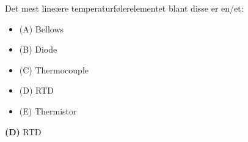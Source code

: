 

Det mest lineære temperaturfølerelementet blant disse er en/et:

\begin{itemize}
\item{(A)} Bellows
\vskip 5pt 
\item{(B)} Diode
\vskip 5pt 
\item{(C)} Thermocouple
\vskip 5pt 
\item{(D)} RTD
\vskip 5pt 
\item{(E)} Thermistor
\end{itemize}







{\bf (D)} RTD
 









